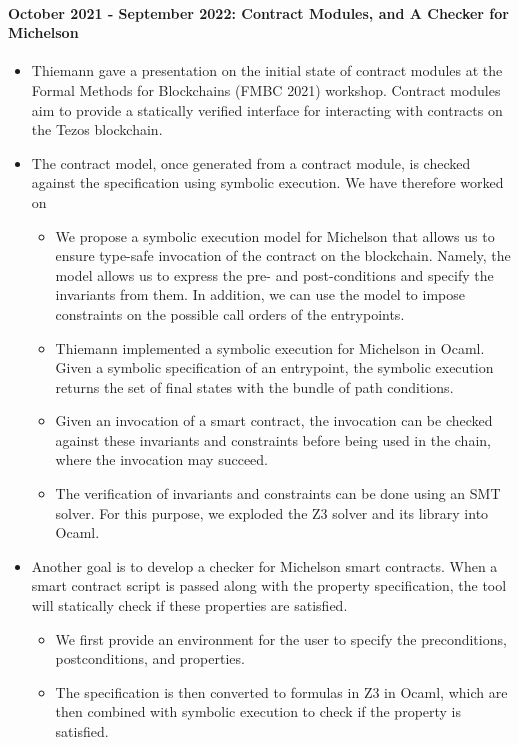 \documentclass[a4paper,11pt]{article}
\begin{document}
\paragraph{October 2021 - September 2022: Contract Modules, and A Checker for Michelson}
\begin{itemize}
\item Thiemann gave a presentation on the initial state of contract modules at the Formal Methods for Blockchains (FMBC 2021) workshop. Contract modules aim to provide a statically verified interface for interacting with contracts on the Tezos blockchain.
\item The contract model, once generated from a contract module, is checked against the specification using symbolic execution. We have therefore worked on

\begin{itemize}
\item We propose a symbolic execution model for Michelson that allows us to ensure type-safe invocation of the contract on the blockchain. Namely, the model allows us to express the pre- and post-conditions and specify the invariants from them. In addition, we can use the model to impose constraints on the possible call orders of the entrypoints.
\item Thiemann implemented a symbolic execution for Michelson in Ocaml. Given a symbolic specification of an entrypoint, the symbolic execution returns the set of final states with the bundle of path conditions. 
\item Given an invocation of a smart contract, the invocation can be checked against these invariants and constraints before being used in the chain, where the invocation may succeed. 
\item The verification of invariants and constraints can be done using an SMT solver. For this purpose, we exploded the Z3 solver and its library into Ocaml.
\end{itemize}

\item Another goal is to develop a checker for Michelson smart contracts. When a smart contract script is passed along with the property specification, the tool will statically check if these properties are satisfied.
\begin{itemize}
\item We first provide an environment for the user to specify the preconditions, postconditions, and properties. 
\item The specification is then converted to formulas in Z3 in Ocaml, which are then combined with symbolic execution to check if the property is satisfied. 
\end{itemize}

\end{itemize}
\end{document}

